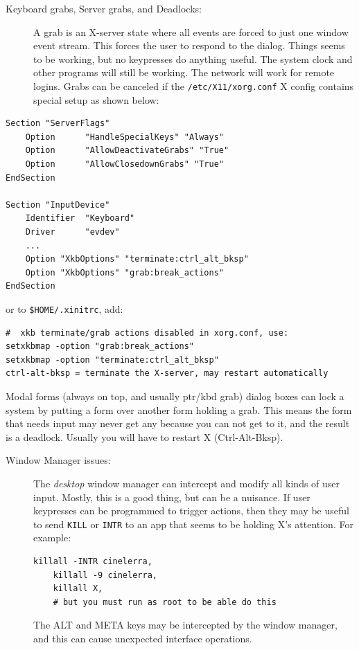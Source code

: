 \begin{description}
	\item[Keyboard grabs, Server grabs, and Deadlocks:] A grab is an X-server state where all events are forced to just one window event stream.  This forces the user to respond to the dialog.  Things seems to be working, but no keypresses do anything useful. The system clock and other programs will still be working.  The network will work for remote logins. Grabs can be canceled if the \texttt{/etc/X11/xorg.conf} X config contains special setup as shown below:
\end{description}

\begin{lstlisting}[numbers=none]
Section "ServerFlags"
	Option      "HandleSpecialKeys" "Always"
	Option      "AllowDeactivateGrabs" "True"
	Option      "AllowClosedownGrabs" "True"
EndSection

Section "InputDevice"
	Identifier  "Keyboard"
	Driver      "evdev"
	...
	Option "XkbOptions" "terminate:ctrl_alt_bksp"
	Option "XkbOptions" "grab:break_actions"
EndSection
\end{lstlisting}

or to \texttt{\$HOME/.xinitrc}, add:

\begin{lstlisting}[numbers=none]
#  xkb terminate/grab actions disabled in xorg.conf, use:	
setxkbmap -option "grab:break_actions"
setxkbmap -option "terminate:ctrl_alt_bksp"
ctrl-alt-bksp = terminate the X-server, may restart automatically
\end{lstlisting}


Modal forms (always on top, and usually ptr/kbd grab) dialog boxes can lock a system by putting a form over another form holding a grab.  This means the form that needs input may never get any because you can not get to it, and the result is a deadlock.  Usually you will have to restart X (Ctrl-Alt-Bksp).

\begin{description}
	\item[Window Manager issues:] The \textit{desktop} window manager can intercept and modify all kinds of user input.  Mostly, this is a good thing, but can be a nuisance.  If user keypresses can be programmed to trigger actions, then they may be useful to send \texttt{KILL} or \texttt{INTR} to an app that seems to be holding X's attention.  For example:
	\begin{lstlisting}[numbers=none]
	killall -INTR cinelerra,
	killall -9 cinelerra,	
	killall X,
	# but you must run as root to be able do this
	\end{lstlisting}
	The ALT and META keys may be intercepted by the window manager, and this can cause unexpected interface operations.
\end{description}

